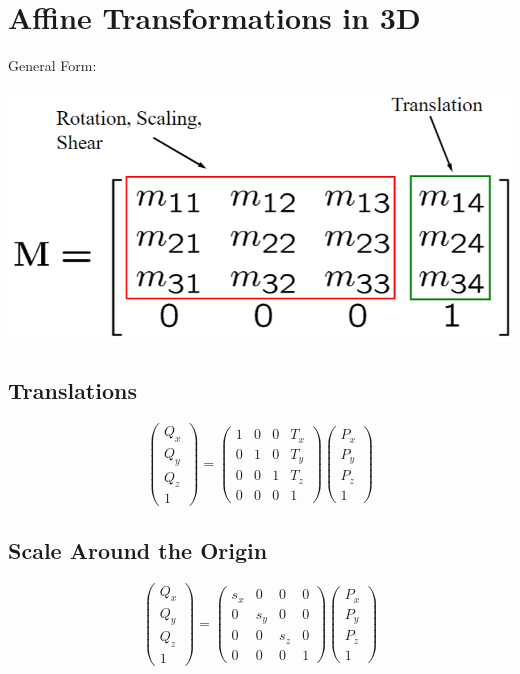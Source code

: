 \documentclass{article}
\begin{document}
\section*{Affine Transformations in 3D}
General Form:
\begin{center}
    \includegraphics*[scale=0.7]{W2_3.png}
\end{center}

\subsection*{Translations}
\[\begin{pmatrix}Q_x \\ Q_y \\ Q_z \\ 1\end{pmatrix} = \begin{pmatrix}1 & 0 & 0 & T_x \\ 0 & 1 & 0 & T_y \\ 0 & 0 & 1 & T_z \\ 0 & 0 & 0 & 1\end{pmatrix}\begin{pmatrix}P_x \\ P_y \\ P_z \\ 1\end{pmatrix}\]

\subsection*{Scale Around the Origin}
\[\begin{pmatrix}Q_x \\ Q_y \\ Q_z \\ 1\end{pmatrix} = \begin{pmatrix}s_x & 0 & 0 & 0 \\ 0 & s_y & 0 & 0 \\ 0 & 0 & s_z & 0 \\ 0 & 0 & 0 & 1\end{pmatrix}\begin{pmatrix}P_x \\ P_y \\ P_z \\ 1\end{pmatrix}\]
\end{document}
